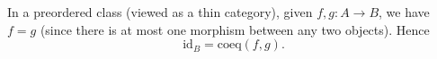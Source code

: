 In a preordered class (viewed as a thin category), given $f, g: A \to B$, we have $f = g$ (since there is at most one morphism between any two objects). Hence
$$\text{id}_B = \text{coeq}(f, g).$$
